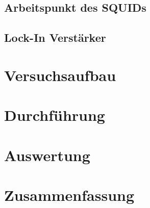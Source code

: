 \documentclass[12pt]{article}
\begin{document}
\subsection{Arbeitspunkt des SQUIDs}

\subsection{Lock-In Verstärker}

\section{Versuchsaufbau}

\section{Durchführung}

\section{Auswertung}

\section{Zusammenfassung}
\end{document}
